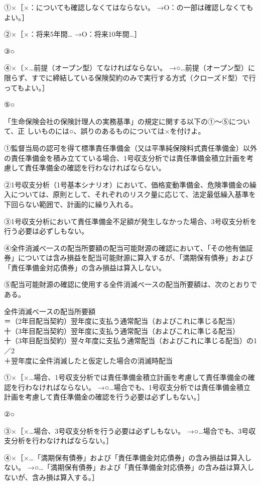 \documentclass[report,gutter=10mm,fore-edge=10mm,uplatex,dvipdfmx]{jlreq}
\begin{document}
\answer{}
①×［×：についても確認しなくてはならない。
→O：の一部は確認しなくてもよい。］

②×［×：将来5年間…
→O：将来10年間…］

③○

④×〔×…前提（オープン型）てなければならない。
→○…前提（オープン型）に限らず、すでに締結している保険契約のみで実行する方式（クローズド型）で行ってもよい。］

⑤○

「生命保険会社の保険計理人の実務基準」の規定に関する以下の①〜⑤について、正
しいものには○、誤りのあるものについては×を付けよ。

①監督当局の認可を得て標準責任準備金（又は平準純保険料式責任準備金）以外の責任準備金を積み立てている場合、1号収支分析では責任準備金積立計画を考慮して責任準備金の確認を行わなければならない。

②1号収支分析（1号基本シナリオ）において、価格変動準備金、危険準備金の繰入については、原則として、それぞれのリスク量に応じて、法定最低繰入基準を下回らない範囲で、計画的に繰り入れる。

③1号収支分析において責任準備金不足額が発生しなかった場合、3号収支分析を行う必要は必ずしもない。

④全件消滅べ一スの配当所要額の配当可能財源の確認において、「その他有価証券」については含み損益を配当可能財源に算入するが、「満期保有債券」および「責任準備金対応債券」の含み損益は算入しない。

⑤配当可能財源の確認に使用する全件消滅べ一スの配当所要額は、次のとおりである。

全件消滅べ一スの配当所要額\\
＝（2年目配当契約）翌年度に支払う通常配当（およびこれに準じる配当）\\
十（3年目配当契約）翌年度に支払う通常配当（およびこれに準じる配当）\\
十（3年目配当契約）翌々年度に支払う通常配当（およびこれに準じる配当）の1／2\\
＋翌年度に全件消滅したと仮定した場合の消滅時配当

\answer{}
①×［×…場合、1号収支分析では責任準備金積立計画を考慮して責任準備金の確認を行わなければならない。
→○…場合でも、1号収支分析では責任準備金積立計画を考慮して責任準備金の確認を行う必要は必ずしもない。］

②○

③×［×…場合、3号収支分析を行う必要は必ずしもない。
→○…場合でも、3号収支分析を行わなければならない。］

④×［×…「満期保有債券」および「責任準備金対応債券」の含み損益は算入しない。
→○…「満期保有債券」および「責任準備金対応債券」の含み益は算入しないが、含み損は算入する。］
\end{document}
